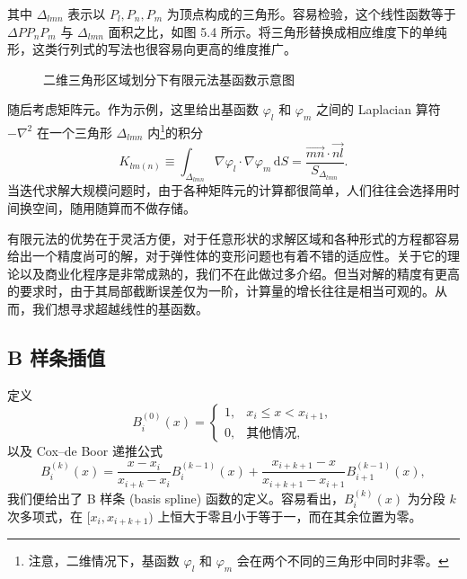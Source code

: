 其中 $\Delta_{lmn}$ 表示以 $P_l,P_n,P_m$ 为顶点构成的三角形。容易检验，这个线性函数等于 $\Delta PP_nP_m$ 与 $\Delta_{lmn}$ 面积之比，如图 5.4 所示。将三角形替换成相应维度下的单纯形，这类行列式的写法也很容易向更高的维度推广。

\begin{figure}[htbp]
\centering
{}
\caption{二维三角形区域划分下有限元法基函数示意图}
\label{fig:fe-triangle-basis}
\end{figure}

随后考虑矩阵元。作为示例，这里给出基函数 $\varphi_l$ 和 $\varphi_m$ 之间的 Laplacian 算符 $-\nabla^2$ 在一个三角形 $\Delta_{lmn}$ 内\footnote{注意，二维情况下，基函数 $\varphi_l$ 和 $\varphi_m$ 会在两个不同的三角形中同时非零。}的积分
\begin{equation}
K_{lm(n)}\equiv\int_{\Delta_{lmn}}\nabla\varphi_l\cdot\nabla\varphi_m\,\mathrm dS
=\frac{\overrightarrow{mn}\cdot\overrightarrow{nl}}{S_{\Delta_{lmn}}}.
\tag{5.4.26}
\end{equation}
当迭代求解大规模问题时，由于各种矩阵元的计算都很简单，人们往往会选择用时间换空间，随用随算而不做存储。

有限元法的优势在于灵活方便，对于任意形状的求解区域和各种形式的方程都容易给出一个精度尚可的解，对于弹性体的变形问题也有着不错的适应性。关于它的理论以及商业化程序是非常成熟的，我们不在此做过多介绍。但当对解的精度有更高的要求时，由于其局部截断误差仅为一阶，计算量的增长往往是相当可观的。从而，我们想寻求超越线性的基函数。

\subsection{B 样条插值}

定义
\begin{equation}
B_i^{(0)}(x)=
\begin{cases}
1,&x_i\le x<x_{i+1},\\
0,&\text{其他情况},
\end{cases}
\tag{5.4.27}
\end{equation}
以及 Cox--de Boor 递推公式
\begin{equation}
B_i^{(k)}(x)=\frac{x-x_i}{x_{i+k}-x_i}B_i^{(k-1)}(x)
+\frac{x_{i+k+1}-x}{x_{i+k+1}-x_{i+1}}B_{i+1}^{(k-1)}(x),
\tag{5.4.28}
\end{equation}
我们便给出了 B 样条 (basis spline) 函数的定义。容易看出，$B_i^{(k)}(x)$ 为分段 $k$ 次多项式，在 $[x_i,x_{i+k+1})$ 上恒大于零且小于等于一，而在其余位置为零。

